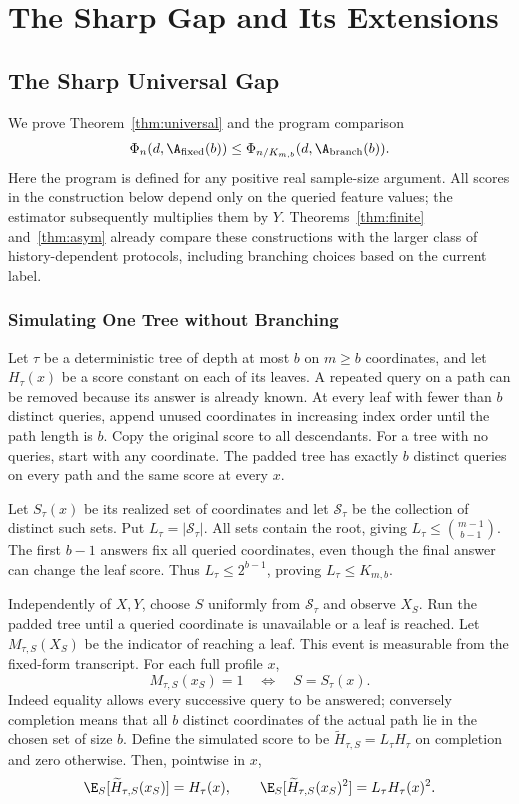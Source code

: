 \section{The Sharp Gap and Its Extensions}\label{app:C}
\subsection{The Sharp Universal Gap}\label{app:universal}
We prove Theorem~\ref{thm:universal} and the program comparison
\begin{equation}
 \Phi_n(d,\A_{\rm fixed}(b))
 \le \Phi_{n/K_{m,b}}(d,\A_{\rm branch}(b)).
 \label{eq:programsimulation}
\end{equation}
Here the program is defined for any positive real sample-size argument.
All scores in the construction below depend only on the queried feature values; the estimator subsequently multiplies them by $Y$. Theorems~\ref{thm:finite} and~\ref{thm:asym} already compare these constructions with the larger class of history-dependent protocols, including branching choices based on the current label.

\subsubsection{Simulating One Tree without Branching}
Let $\tau$ be a deterministic tree of depth at most $b$ on $m\ge b$ coordinates, and let $H_\tau(x)$ be a score constant on each of its leaves. A repeated query on a path can be removed because its answer is already known. At every leaf with fewer than $b$ distinct queries, append unused coordinates in increasing index order until the path length is $b$. Copy the original score to all descendants. For a tree with no queries, start with any coordinate. The padded tree has exactly $b$ distinct queries on every path and the same score at every $x$.

Let $S_\tau(x)$ be its realized set of coordinates and let $\mathcal S_\tau$ be the collection of distinct such sets. Put $L_\tau=|\mathcal S_\tau|$. All sets contain the root, giving $L_\tau\le\binom{m-1}{b-1}$. The first $b-1$ answers fix all queried coordinates, even though the final answer can change the leaf score. Thus $L_\tau\le2^{b-1}$, proving $L_\tau\le K_{m,b}$.

Independently of $X,Y$, choose $S$ uniformly from $\mathcal S_\tau$ and observe $X_S$. Run the padded tree until a queried coordinate is unavailable or a leaf is reached. Let $M_{\tau,S}(X_S)$ be the indicator of reaching a leaf. This event is measurable from the fixed-form transcript. For each full profile $x$,
\[
 M_{\tau,S}(x_S)=1\quad\Longleftrightarrow\quad S=S_\tau(x).
\]
Indeed equality allows every successive query to be answered; conversely completion means that all $b$ distinct coordinates of the actual path lie in the chosen set of size $b$. Define the simulated score to be $\widetilde H_{\tau,S}=L_\tau H_\tau$ on completion and zero otherwise. Then, pointwise in $x$,
\begin{equation}
 \E_S[\widetilde H_{\tau,S}(x_S)]=H_\tau(x),\qquad
 \E_S[\widetilde H_{\tau,S}(x_S)^2]=L_\tau H_\tau(x)^2.
 \label{eq:simulate-moments}
\end{equation}


